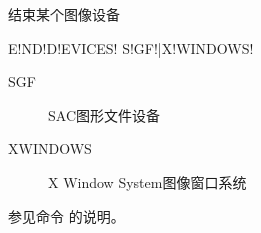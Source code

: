 \label{cmd:enddevices}

结束某个图像设备

\begin{SACSTX}
E!ND!D!EVICES! S!GF!|X!WINDOWS!
\end{SACSTX}

\begin{description}
\item [SGF] SAC图形文件设备
\item [XWINDOWS] X Window System图像窗口系统
\end{description}

参见命令  的说明。
